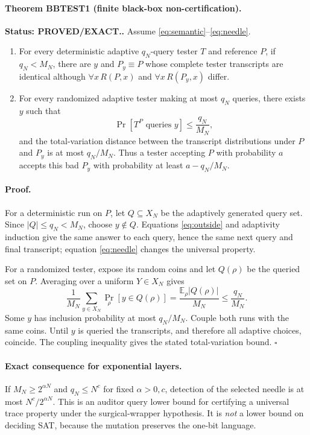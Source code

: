 \documentclass[11pt]{article}
\newcommand{\Status}[1]{\textbf{Status: #1.}}
\begin{document}
\paragraph{Theorem BBTEST1 (finite black-box non-certification).}
\Status{PROVED/EXACT.}
Assume \eqref{eq:semantic}--\eqref{eq:needle}.
\begin{enumerate}[leftmargin=*]
\item For every deterministic adaptive $q_N$-query tester $T$ and reference $P$, if $q_N<M_N$, there are $y$ and $P_y\equiv P$ whose complete tester transcripts are identical although $\forall x\,R(P,x)$ and $\forall x\,R(P_y,x)$ differ.
\item For every randomized adaptive tester making at most $q_N$ queries, there exists $y$ such that
\[
  \Pr[T^P\text{ queries }y]\le \frac{q_N}{M_N},
\]
and the total-variation distance between the transcript distributions under $P$ and $P_y$ is at most $q_N/M_N$.  Thus a tester accepting $P$ with probability $a$ accepts this bad $P_y$ with probability at least $a-q_N/M_N$.
\end{enumerate}

\paragraph{Proof.}
For a deterministic run on $P$, let $Q\subseteq X_N$ be the adaptively generated query set.  Since $|Q|\le q_N<M_N$, choose $y\notin Q$.  Equations \eqref{eq:outside} and adaptivity induction give the same answer to each query, hence the same next query and final transcript; equation \eqref{eq:needle} changes the universal property.

For a randomized tester, expose its random coins and let $Q(\rho)$ be the queried set on $P$.  Averaging over a uniform $Y\in X_N$ gives
\[
 \frac1{M_N}\sum_{y\in X_N}\Pr_\rho[y\in Q(\rho)]
 =\frac{\mathbb E_\rho |Q(\rho)|}{M_N}\le\frac{q_N}{M_N}.
\]
Some $y$ has inclusion probability at most $q_N/M_N$.  Couple both runs with the same coins.  Until $y$ is queried the transcripts, and therefore all adaptive choices, coincide.  The coupling inequality gives the stated total-variation bound. \hfill$\square$

\paragraph{Exact consequence for exponential layers.}
If $M_N\ge 2^{\alpha N}$ and $q_N\le N^c$ for fixed $\alpha>0,c$, detection of the selected needle is at most $N^c/2^{\alpha N}$.  This is an auditor query lower bound for certifying a universal trace property under the surgical-wrapper hypothesis.  It is \emph{not} a lower bound on deciding SAT, because the mutation preserves the one-bit language.
\end{document}
